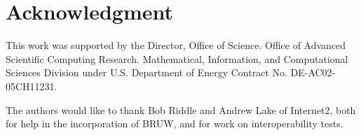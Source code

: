 \documentclass[conference]{IEEEtran}
\begin{document}
\section*{Acknowledgment}
This work was supported by the Director, Office of Science. Office of
Advanced Scientific Computing Research. Mathematical, Information, and
Computational Sciences Division under U.S. Department of
Energy Contract No. DE-AC02-05CH11231.

The authors would like to thank Bob Riddle and Andrew Lake of Internet2, both
for help in the incorporation of BRUW, and for work on interoperability tests.



%
%
%
\end{document}
